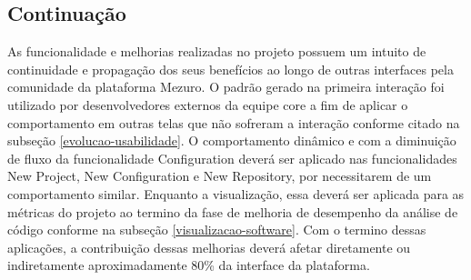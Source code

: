 \subsection{Continuação}
As funcionalidade e melhorias realizadas no projeto possuem um intuito de continuidade e propagação dos seus benefícios ao longo de outras interfaces pela comunidade da plataforma Mezuro. O padrão gerado na primeira interação foi utilizado por desenvolvedores externos da equipe core a fim de aplicar o comportamento em outras telas que não sofreram a interação conforme citado na subseção \ref{evolucao-usabilidade}. O comportamento dinâmico e com a diminuição de fluxo da funcionalidade Configuration deverá ser aplicado nas funcionalidades New Project, New Configuration e New Repository, por necessitarem de um comportamento similar. Enquanto a visualização, essa deverá ser aplicada para as métricas do projeto ao termino da fase de melhoria de desempenho da análise de código conforme na subseção \ref{visualizacao-software}. Com o termino dessas aplicações, a contribuição dessas melhorias deverá afetar diretamente ou indiretamente aproximadamente 80\% da interface da plataforma.

